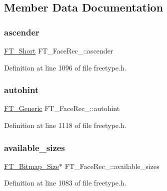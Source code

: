 \subsection{Member Data Documentation}
\mbox{\label{struct_f_t___face_rec___afd0fe7d9dc08a4afbdec0ea0eabb0198}} 
\subsubsection{\texorpdfstring{ascender}{ascender}}
{\footnotesize\ttfamily \mbox{\hyperlink{fttypes_8h_aa7279be89046a2563cd3d4d6651fbdcf}{F\+T\+\_\+\+Short}} F\+T\+\_\+\+Face\+Rec\+\_\+\+::ascender}



Definition at line 1096 of file freetype.\+h.

\mbox{\label{struct_f_t___face_rec___a34ba9b1367f1b2d13676043b8da3ea73}} 
\subsubsection{\texorpdfstring{autohint}{autohint}}
{\footnotesize\ttfamily \mbox{\hyperlink{fttypes_8h_ae15e8550dd7d863328686aadaead5c77}{F\+T\+\_\+\+Generic}} F\+T\+\_\+\+Face\+Rec\+\_\+\+::autohint}



Definition at line 1118 of file freetype.\+h.

\mbox{\label{struct_f_t___face_rec___a563ca9007f754aa0f711ba67050f3e47}} 
\subsubsection{\texorpdfstring{available\_sizes}{available\_sizes}}
{\footnotesize\ttfamily \mbox{\hyperlink{freetype_8h_a6905fdea05db62fabe3ed448cbf6778b}{F\+T\+\_\+\+Bitmap\+\_\+\+Size}}$\ast$ F\+T\+\_\+\+Face\+Rec\+\_\+\+::available\+\_\+sizes}



Definition at line 1083 of file freetype.\+h.

